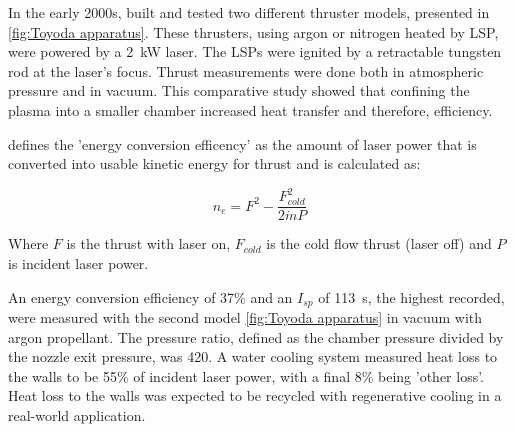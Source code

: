 
        In the early 2000s, \textcite{toyodaThrustPerformanceCW2002} built and tested two different thruster models, presented in \autoref{fig:Toyoda apparatus}. These thrusters, using argon or nitrogen heated by LSP, were powered by a \qty{2}{kW}  laser. The LSPs were ignited by a retractable tungsten rod at the laser's focus. Thrust measurements were done both in atmospheric pressure and in vacuum. This comparative study showed that confining the plasma into a smaller chamber increased heat transfer and therefore, efficiency.
        
        \textcite{toyodaThrustPerformanceCW2002} defines the 'energy conversion efficency' as the amount of laser power that is converted into usable kinetic energy for thrust and is calculated as:

        \[ n_e = F^2 - \frac{F^2_{cold}}{2 \dot{m} P}\]

        Where $F$ is the thrust with laser on, $F_{cold}$ is the cold flow thrust (laser off) and $P$ is incident laser power.

        An energy conversion efficiency of 37\% and an $I_{sp}$ of \qty{113}{s}, the highest recorded, were measured with the second model \autoref{fig:Toyoda apparatus} in vacuum with argon propellant. The pressure ratio, defined as the chamber pressure divided by the nozzle exit pressure, was 420. A water cooling system measured heat loss to the walls to be 55\% of incident laser power, with a final 8\% being 'other loss'. Heat loss to the walls was expected to be recycled with regenerative cooling in a real-world application.

